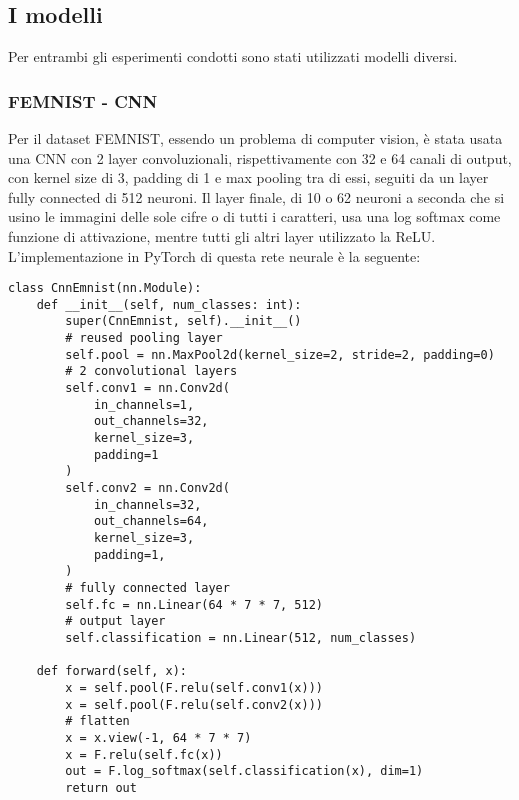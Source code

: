 \subsection{I modelli}
Per entrambi gli esperimenti condotti sono stati utilizzati modelli 
diversi.

\subsubsection{FEMNIST - CNN}
Per il dataset FEMNIST, essendo un problema di computer vision, è stata 
usata una CNN con 2 layer convoluzionali, rispettivamente con 32 e 
64 canali di output, con kernel size di 3, padding di 1
e max pooling tra di essi, seguiti da un layer fully connected 
di 512 neuroni. Il layer finale, di 10 o 62 neuroni a seconda che si 
usino le immagini delle sole cifre o di tutti i caratteri, usa una 
log softmax come funzione di attivazione, mentre tutti gli altri layer 
utilizzato la ReLU. L'implementazione in PyTorch di questa rete neurale
è la seguente:

\begin{lstlisting}
class CnnEmnist(nn.Module):
    def __init__(self, num_classes: int):
        super(CnnEmnist, self).__init__()
        # reused pooling layer
        self.pool = nn.MaxPool2d(kernel_size=2, stride=2, padding=0)
        # 2 convolutional layers
        self.conv1 = nn.Conv2d(
            in_channels=1,
            out_channels=32,
            kernel_size=3,
            padding=1
        )
        self.conv2 = nn.Conv2d(
            in_channels=32,
            out_channels=64,
            kernel_size=3,
            padding=1,
        )
        # fully connected layer
        self.fc = nn.Linear(64 * 7 * 7, 512)
        # output layer
        self.classification = nn.Linear(512, num_classes)

    def forward(self, x):
        x = self.pool(F.relu(self.conv1(x)))
        x = self.pool(F.relu(self.conv2(x)))
        # flatten
        x = x.view(-1, 64 * 7 * 7)
        x = F.relu(self.fc(x))
        out = F.log_softmax(self.classification(x), dim=1)
        return out
\end{lstlisting}


